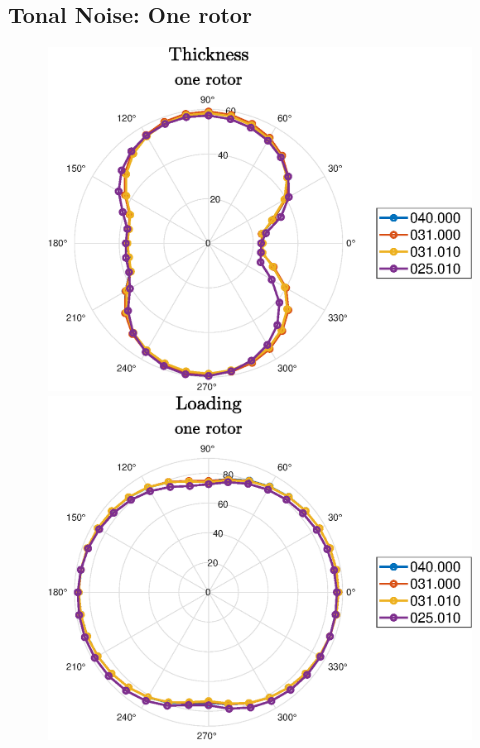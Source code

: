 \subsection{Tonal Noise: One rotor}
\begin{frame}{\subsecname}
    \begin{figure} [H]  
	\centering
	\subfloat
	{\includegraphics[scale=0.35]{Photos/thickness_comparison.eps}}
	\subfloat
	{\includegraphics[scale=0.35]{Photos/loading_comparison.eps}
  }
\end{figure} 
\end{frame}

